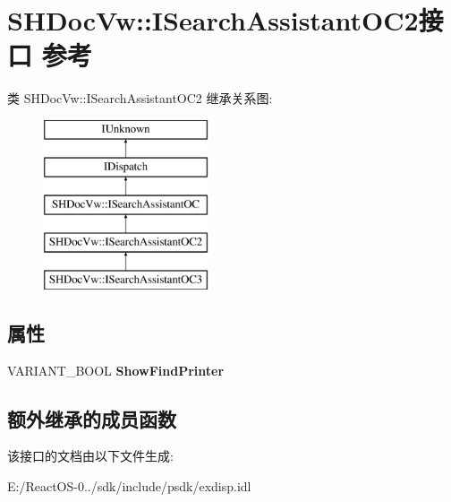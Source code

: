 \hypertarget{interface_s_h_doc_vw_1_1_i_search_assistant_o_c2}{}\section{S\+H\+Doc\+Vw\+:\+:I\+Search\+Assistant\+O\+C2接口 参考}
\label{interface_s_h_doc_vw_1_1_i_search_assistant_o_c2}
类 S\+H\+Doc\+Vw\+:\+:I\+Search\+Assistant\+O\+C2 继承关系图\+:\begin{figure}[H]
\begin{center}
\leavevmode
\includegraphics[height=5.000000cm]{interface_s_h_doc_vw_1_1_i_search_assistant_o_c2}
\end{center}
\end{figure}
\subsection*{属性}
\begin{DoxyCompactItemize}
\item 
\mbox{\label{interface_s_h_doc_vw_1_1_i_search_assistant_o_c2_af7314500c8bc29a911d9ef46009b7362}} 
V\+A\+R\+I\+A\+N\+T\+\_\+\+B\+O\+OL {\bfseries Show\+Find\+Printer}
\end{DoxyCompactItemize}
\subsection*{额外继承的成员函数}


该接口的文档由以下文件生成\+:\begin{DoxyCompactItemize}
\item 
E\+:/\+React\+O\+S-\/0../sdk/include/psdk/exdisp.\+idl\end{DoxyCompactItemize}
